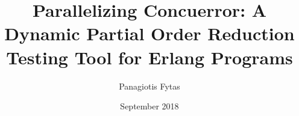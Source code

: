 \documentclass[diploma, english]{softlab-thesis}
\theoremstyle{definition}
\begin{document}

\frontmatter

\title{Parallelizing Concuerror: A Dynamic Partial Order Reduction Testing Tool for Erlang Programs}
\author{Panagiotis Fytas}
\date{September 2018}




\maketitle



\iffalse
\begin{abstractgr}%
  

  
\begin{keywordsgr}

\end{keywordsgr}
\end{abstractgr}
\fi

\begin{abstracten}%
  

  
\begin{keywordsen}

\end{keywordsen}
\end{abstracten}


\iffalse
\begin{acknowledgementsgr}


\end{acknowledgementsgr}
\fi

\begin{acknowledgementsen}


\end{acknowledgementsen}


\tableofcontents
\listoftables
\listoffigures
\listoflistings
\listofalgorithms
{}

\mainmatter




 

 



\nocite{*}







\end{document}
